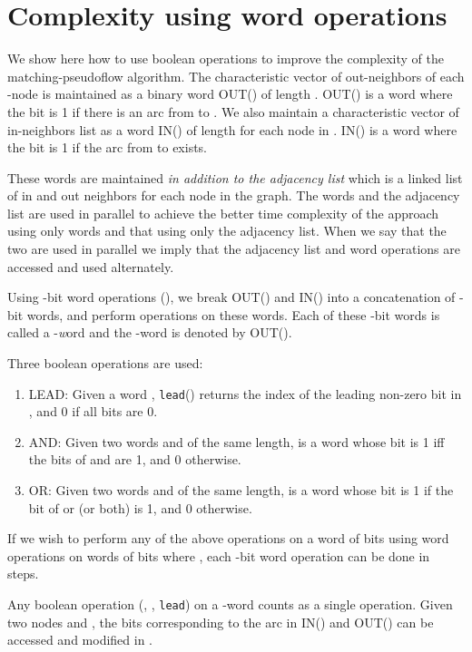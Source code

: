 \documentclass{article}
\begin{document}
\section{Complexity using word operations}
\label{sec:words}
We show here how to use boolean operations to improve the complexity of the {\sf matching-pseudoflow} algorithm. The characteristic vector of out-neighbors of each -node  is maintained as a binary word OUT() of length . OUT() is a word where the  bit is 1 if there is an arc from  to . We also maintain a characteristic vector of in-neighbors list as a word IN() of length  for each node in . IN() is a word where the  bit is 1 if the arc from  to  exists.

These words are maintained {\em in addition to the adjacency list} which is a linked list of in and out neighbors for each node in the graph. The words and the adjacency list are used in parallel to achieve the better time complexity of the approach using only words and that using only the adjacency list. When we say that the two are used in parallel we imply that the adjacency list and word operations are accessed and used alternately.

Using -bit word operations (), we break OUT() and IN() into a concatenation of -bit words, and perform operations on these words. Each of these -bit words is called a -{\emph word} and the  -word is denoted by OUT().

Three boolean operations are used:
\begin{enumerate}
\item LEAD:  Given a word , {\tt lead}() returns the index of the leading non-zero bit in , and 0 if all bits are 0.
\item AND: Given two words  and  of the same length,  is a word whose  bit is 1 iff the  bits of  and  are 1, and 0 otherwise.
\item OR: Given two words  and  of the same length,  is a word whose  bit is 1 if the  bit of  or  (or both) is 1, and 0 otherwise.
\end{enumerate}

If we wish to perform any of the above operations on a word of  bits using word operations on words of  bits where , each -bit word operation can be done in  steps.

Any boolean operation (, , {\tt lead}) on a -word counts as a single operation. Given two nodes  and , the bits corresponding to the arc  in IN() and OUT() can be accessed and modified in .
\end{document}
